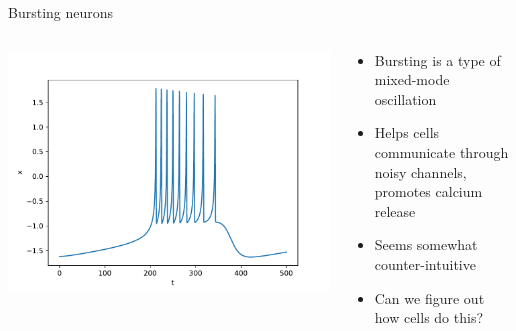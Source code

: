 \documentclass[presentation]{beamer}
\begin{document}
\begin{frame}[label={sec:orgaad54cf}]{Bursting neurons}
\begin{columns}
\begin{column}{0.5\columnwidth}
\includegraphics[width=1.2\textwidth]{./burst.pdf}
\end{column}

\begin{column}{0.5\columnwidth}
\begin{itemize}
\item Bursting is a type of mixed-mode oscillation
\item Helps cells communicate through noisy channels, promotes calcium release
\item Seems somewhat counter-intuitive
\item Can we figure out how cells do this?
\end{itemize}
\end{column}
\end{columns}
\end{frame}
\end{document}
